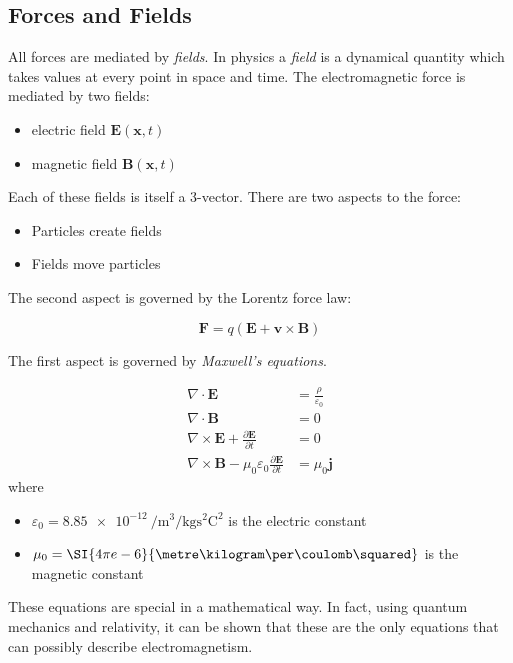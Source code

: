 \documentclass[a4paper]{article}
\begin{document}
\subsection{Forces and Fields}
All forces are mediated by \emph{fields}. In physics a \emph{field} is a dynamical quantity which takes values at every point in space and time. The electromagnetic force is mediated by two fields:
\begin{itemize}
  \item electric field $\mathbf{E}(\mathbf{x}, t)$
  \item magnetic field $\mathbf{B}(\mathbf{x}, t)$
\end{itemize}
Each of these fields is itself a 3-vector. There are two aspects to the force:
\begin{itemize}
  \item Particles create fields
  \item Fields move particles
\end{itemize}
The second aspect is governed by the Lorentz force law:
\begin{law}
\[
  \mathbf{F} = q(\mathbf{E} + \mathbf{v}\times \mathbf{B})
\]
\end{law}
The first aspect is governed by \emph{Maxwell's equations}.
\begin{law}
  \begin{align*}
    \nabla \cdot \mathbf{E} &= \frac{\rho}{\varepsilon_0}\\
    \nabla \cdot \mathbf{B} &= 0\\
    \nabla \times \mathbf{E} +\frac{\partial \mathbf{E}}{\partial t} &= 0\\
    \nabla \times \mathbf{B} - \mu_0\varepsilon_0 \frac{\partial \mathbf{E}}{\partial t} &= \mu_0 \mathbf{j}
  \end{align*}
  where
  \begin{itemize}
    \item $\varepsilon_0 = \SI{8.85e-12}{\per\metre\cubed\per\kilogram\s\squared\coulomb\squared}$ is the electric constant
    \item $\mu_0 = \SI{4\pi e-6}{\metre\kilogram\per\coulomb\squared}$ is the magnetic constant
  \end{itemize}
\end{law}
These equations are special in a mathematical way. In fact, using quantum mechanics and relativity, it can be shown that these are the only equations that can possibly describe electromagnetism.
\end{document}
